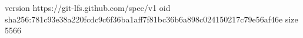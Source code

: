 version https://git-lfs.github.com/spec/v1
oid sha256:781c93e38a220fcdc9c6f36ba1aff7f81bc36b6a898c024150217c79e56af46e
size 5566
